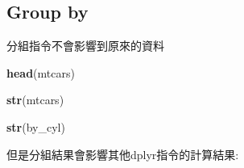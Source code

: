 \documentclass[]{book}
\newenvironment{Shaded}{\begin{snugshade}}{\end{snugshade}}
\newcommand{\KeywordTok}[1]{\textcolor[rgb]{0.13,0.29,0.53}{\textbf{#1}}}
\newcommand{\DataTypeTok}[1]{\textcolor[rgb]{0.13,0.29,0.53}{#1}}
\newcommand{\StringTok}[1]{\textcolor[rgb]{0.31,0.60,0.02}{#1}}
\newcommand{\OperatorTok}[1]{\textcolor[rgb]{0.81,0.36,0.00}{\textbf{#1}}}
\newcommand{\NormalTok}[1]{#1}
\theoremstyle{definition}
\theoremstyle{definition}
\theoremstyle{definition}
\theoremstyle{remark}
\begin{document}
\begin{Shaded}
\end{Shaded}

\begin{Shaded}
\end{Shaded}

\subsection{Group by}\label{group-by}

分組指令不會影響到原來的資料

\begin{Shaded}
\begin{Highlighting}[]
\KeywordTok{head}\NormalTok{(mtcars)}
\end{Highlighting}
\end{Shaded}

\begin{Shaded}
\begin{Highlighting}[]
\KeywordTok{str}\NormalTok{(mtcars)}
\end{Highlighting}
\end{Shaded}

\begin{Shaded}
\end{Shaded}

\begin{Shaded}
\begin{Highlighting}[]
\KeywordTok{str}\NormalTok{(by_cyl)}
\end{Highlighting}
\end{Shaded}

但是分組結果會影響其他dplyr指令的計算結果:

\begin{Shaded}
\end{Shaded}
\end{document}
